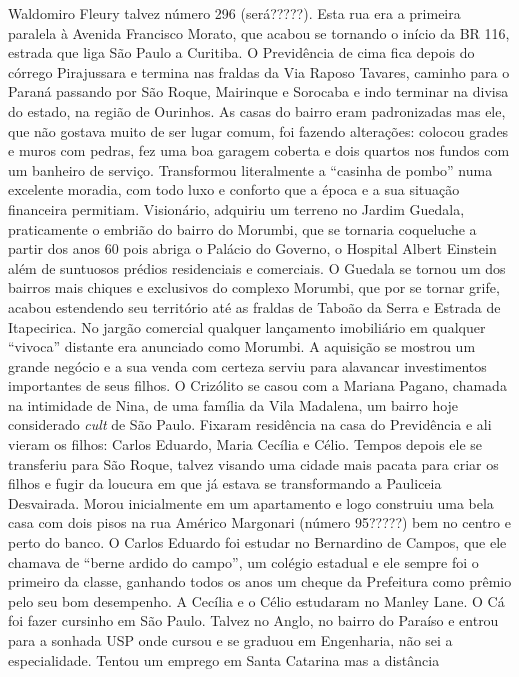 \documentclass[12pt,brazil,]{book}
\begin{document}
Waldomiro Fleury talvez número 296 (será?????). Esta rua era a primeira
paralela à Avenida Francisco Morato, que acabou se tornando o início da
BR 116, estrada que liga São Paulo a Curitiba. O Previdência de cima
fica depois do córrego Pirajussara e termina nas fraldas da Via Raposo
Tavares, caminho para o Paraná passando por São Roque, Mairinque e
Sorocaba e indo terminar na divisa do estado, na região de Ourinhos. As
casas do bairro eram padronizadas mas ele, que não gostava muito de ser
lugar comum, foi fazendo alterações: colocou grades e muros com pedras,
fez uma boa garagem coberta e dois quartos nos fundos com um banheiro de
serviço. Transformou literalmente a ``casinha de pombo'' numa excelente
moradia, com todo luxo e conforto que a época e a sua situação
financeira permitiam. Visionário, adquiriu um terreno no Jardim Guedala,
praticamente o embrião do bairro do Morumbi, que se tornaria coqueluche
a partir dos anos 60 pois abriga o Palácio do Governo, o Hospital Albert
Einstein além de suntuosos prédios residenciais e comerciais. O Guedala
se tornou um dos bairros mais chiques e exclusivos do complexo Morumbi,
que por se tornar grife, acabou estendendo seu território até as fraldas
de Taboão da Serra e Estrada de Itapecirica. No jargão comercial
qualquer lançamento imobiliário em qualquer ``vivoca'' distante era
anunciado como Morumbi. A aquisição se mostrou um grande negócio e a sua
venda com certeza serviu para alavancar investimentos importantes de
seus filhos. O Crizólito se casou com a Mariana Pagano, chamada na
intimidade de Nina, de uma família da Vila Madalena, um bairro hoje
considerado \emph{cult} de São Paulo. Fixaram residência na casa do
Previdência e ali vieram os filhos: Carlos Eduardo, Maria Cecília e
Célio. Tempos depois ele se transferiu para São Roque, talvez visando
uma cidade mais pacata para criar os filhos e fugir da loucura em que já
estava se transformando a Pauliceia Desvairada. Morou inicialmente em um
apartamento e logo construiu uma bela casa com dois pisos na rua Américo
Margonari (número 95?????) bem no centro e perto do banco. O Carlos
Eduardo foi estudar no Bernardino de Campos, que ele chamava de ``berne
ardido do campo'', um colégio estadual e ele sempre foi o primeiro da
classe, ganhando todos os anos um cheque da Prefeitura como prêmio pelo
seu bom desempenho. A Cecília e o Célio estudaram no Manley Lane. O Cá
foi fazer cursinho em São Paulo. Talvez no Anglo, no bairro do Paraíso e
entrou para a sonhada USP onde cursou e se graduou em Engenharia, não
sei a especialidade. Tentou um emprego em Santa Catarina mas a distância
\end{document}
